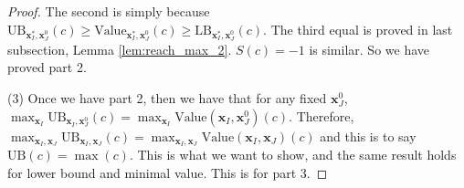 \documentclass[]{article}
\newtheorem{lemma}{Lemma}
\theoremstyle{definition}
\newcommand{\Val}{\mathrm{Value}}
\newcommand{\UB}{\mathrm{UB}}
\newcommand{\LB}{\mathrm{LB}}
\begin{document}
\begin{proof}
	The second is simply because $\UB_{\boldsymbol{x}^*_I,\boldsymbol{x}^0_J}(c)\geq \Val_{\boldsymbol{x}^*_I,\boldsymbol{x}^0_J}(c)\geq\LB_{\boldsymbol{x}^*_I,\boldsymbol{x}^0_J}(c)$.	The third equal is proved in last subsection, Lemma \ref{lem:reach_max_2}. $S(c)=-1$ is similar. So we have proved part 2.
	
	(3) Once we have part 2, then we have that for any fixed $\boldsymbol{x}^0_J$, $\max_{\boldsymbol{x}_I} \UB_{\boldsymbol{x}_I,\boldsymbol{x}^0_J}(c)= \max_{\boldsymbol{x}_I} \Val(\boldsymbol{x}_I,\boldsymbol{x}^0_J)(c)$. Therefore, $\max_{\boldsymbol{x}_I,\boldsymbol{x}_J} \UB_{\boldsymbol{x}_I,\boldsymbol{x}_J}(c)= \max_{\boldsymbol{x}_I,\boldsymbol{x}_J} \Val(\boldsymbol{x}_I,\boldsymbol{x}_J)(c)$ and this is to say $\UB(c)=\max(c)$. This is what we want to show, and the same result holds for lower bound and minimal value. This is for part 3.
	
	
	

\end{proof}



%	
%	
\end{document}
